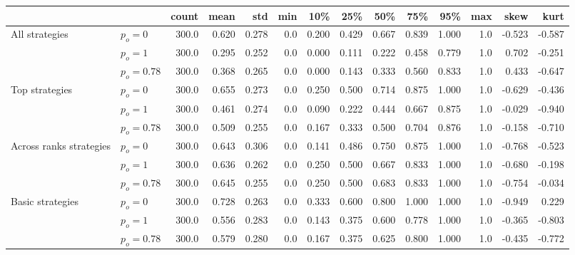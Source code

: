\begin{tabular}{llrrrrrrrrrrrr}
\toprule
                 &            &  count &   mean &    std &  min &    10\% &    25\% &    50\% &    75\% &    95\% &  max &   skew &   kurt \\
\midrule
All strategies & $p_o=0$ &  300.0 &  0.620 &  0.278 &  0.0 &  0.200 &  0.429 &  0.667 &  0.839 &  1.000 &  1.0 & -0.523 & -0.587 \\
                 & $p_o=1$ &  300.0 &  0.295 &  0.252 &  0.0 &  0.000 &  0.111 &  0.222 &  0.458 &  0.779 &  1.0 &  0.702 & -0.251 \\
                 & $p_o=0.78$ &  300.0 &  0.368 &  0.265 &  0.0 &  0.000 &  0.143 &  0.333 &  0.560 &  0.833 &  1.0 &  0.433 & -0.647 \\
                 \midrule
Top strategies & $p_o=0$ &  300.0 &  0.655 &  0.273 &  0.0 &  0.250 &  0.500 &  0.714 &  0.875 &  1.000 &  1.0 & -0.629 & -0.436 \\
                 & $p_o=1$ &  300.0 &  0.461 &  0.274 &  0.0 &  0.090 &  0.222 &  0.444 &  0.667 &  0.875 &  1.0 & -0.029 & -0.940 \\
                 & $p_o=0.78$ &  300.0 &  0.509 &  0.255 &  0.0 &  0.167 &  0.333 &  0.500 &  0.704 &  0.876 &  1.0 & -0.158 & -0.710 \\
                 \midrule
Across ranks strategies & $p_o=0$ &  300.0 &  0.643 &  0.306 &  0.0 &  0.141 &  0.486 &  0.750 &  0.875 &  1.000 &  1.0 & -0.768 & -0.523 \\
                 & $p_o=1$ &  300.0 &  0.636 &  0.262 &  0.0 &  0.250 &  0.500 &  0.667 &  0.833 &  1.000 &  1.0 & -0.680 & -0.198 \\
                 & $p_o=0.78$ &  300.0 &  0.645 &  0.255 &  0.0 &  0.250 &  0.500 &  0.683 &  0.833 &  1.000 &  1.0 & -0.754 & -0.034 \\
                 \midrule
Basic strategies & $p_o=0$ &  300.0 &  0.728 &  0.263 &  0.0 &  0.333 &  0.600 &  0.800 &  1.000 &  1.000 &  1.0 & -0.949 &  0.229 \\
                 & $p_o=1$ &  300.0 &  0.556 &  0.283 &  0.0 &  0.143 &  0.375 &  0.600 &  0.778 &  1.000 &  1.0 & -0.365 & -0.803 \\
                 & $p_o=0.78$ &  300.0 &  0.579 &  0.280 &  0.0 &  0.167 &  0.375 &  0.625 &  0.800 &  1.000 &  1.0 & -0.435 & -0.772 \\
\bottomrule
\end{tabular}
